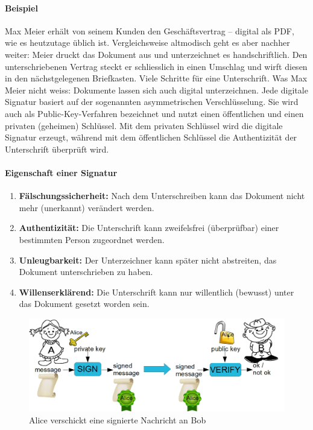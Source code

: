 \documentclass[10pt,a4paper]{article}
\begin{document}
\paragraph*{Beispiel}Max Meier erhält von seinem Kunden den Geschäftsvertrag – digital als PDF, wie es heutzutage üblich ist. Vergleichsweise altmodisch geht es aber nachher weiter: Meier druckt das Dokument aus und unterzeichnet es handschriftlich. Den unterschriebenen Vertrag steckt er schliesslich in einen Umschlag und wirft diesen in den nächstgelegenen Briefkasten. Viele Schritte für eine Unterschrift. Was Max Meier nicht weiss: Dokumente lassen sich auch digital unterzeichnen. Jede digitale Signatur basiert auf der sogenannten asymmetrischen Verschlüsselung. Sie wird auch als Public-Key-Verfahren bezeichnet und nutzt einen öffentlichen und einen privaten (geheimen) Schlüssel. Mit dem privaten Schlüssel wird die digitale Signatur erzeugt, während mit dem öffentlichen Schlüssel die Authentizität der Unterschrift überprüft wird.

\paragraph*{Eigenschaft einer Signatur}
\begin{enumerate}[noitemsep,topsep=0pt,leftmargin=*]
    \item \textbf{Fälschungssicherheit:} Nach dem Unterschreiben kann das Dokument nicht mehr (unerkannt) verändert werden.
    \item \textbf{Authentizität:} Die Unterschrift kann zweifelsfrei (überprüfbar) einer bestimmten Person zugeordnet werden.
    \item \textbf{Unleugbarkeit:} Der Unterzeichner kann später nicht abstreiten, das Dokument unterschrieben zu haben.
    \item \textbf{Willenserklärend:} Die Unterschrift kann nur willentlich (bewusst) unter das Dokument gesetzt worden sein.
\end{enumerate}
\begin{figure}[H]
    \begin{center}
    \includegraphics[width=12cm]{images/digisignatur0.png}
    \caption{Alice verschickt eine signierte Nachricht an Bob}
    \label{digisig0}
    \end{center}
\end{figure}
\end{document}
